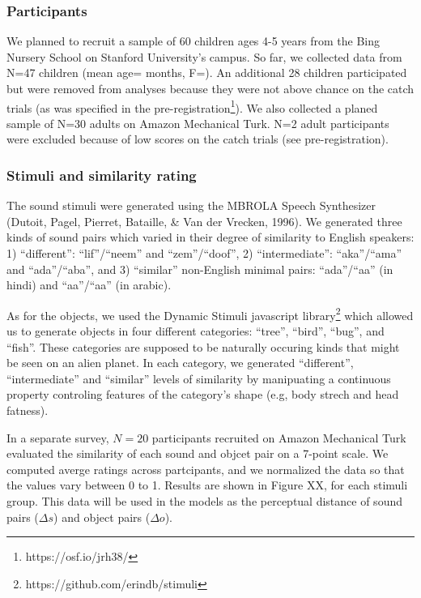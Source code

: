 \documentclass[10pt, letterpaper]{article}
\begin{document}
\subsubsection{Participants}\label{participants}

We planned to recruit a sample of 60 children ages 4-5 years from the
Bing Nursery School on Stanford University's campus. So far, we
collected data from N=47 children (mean age= months, F=). An additional
28 children participated but were removed from analyses because they
were not above chance on the catch trials (as was specified in the
pre-registration\footnote{https://osf.io/jrh38/}). We also collected a
planed sample of N=30 adults on Amazon Mechanical Turk. N=2 adult
participants were excluded because of low scores on the catch trials
(see pre-registration).

\subsubsection{Stimuli and similarity
rating}\label{stimuli-and-similarity-rating}

The sound stimuli were generated using the MBROLA Speech Synthesizer
(Dutoit, Pagel, Pierret, Bataille, \& Van der Vrecken, 1996). We
generated three kinds of sound pairs which varied in their degree of
similarity to English speakers: 1) ``different'': ``lif''/``neem'' and
``zem''/``doof'', 2) ``intermediate'': ``aka''/``ama'' and
``ada''/``aba'', and 3) ``similar'' non-English minimal pairs:
``ada''/``aa'' (in hindi) and
``aa''/``a\textipa{\textcrh}a'' (in arabic).

As for the objects, we used the Dynamic Stimuli javascript
library\footnote{https://github.com/erindb/stimuli} which allowed us to
generate objects in four different categories: ``tree'', ``bird'',
``bug'', and ``fish''. These categories are supposed to be naturally
occuring kinds that might be seen on an alien planet. In each category,
we generated ``different'', ``intermediate'' and ``similar'' levels of
similarity by manipuating a continuous property controling features of
the category's shape (e.g, body strech and head fatness).

In a separate survey, \(N=20\) participants recruited on Amazon
Mechanical Turk evaluated the similarity of each sound and objcet pair
on a 7-point scale. We computed averge ratings across partcipants, and
we normalized the data so that the values vary between 0 to 1. Results
are shown in Figure XX, for each stimuli group. This data will be used
in the models as the perceptual distance of sound pairs (\(\Delta s\))
and object pairs (\(\Delta o\)).
\end{document}
